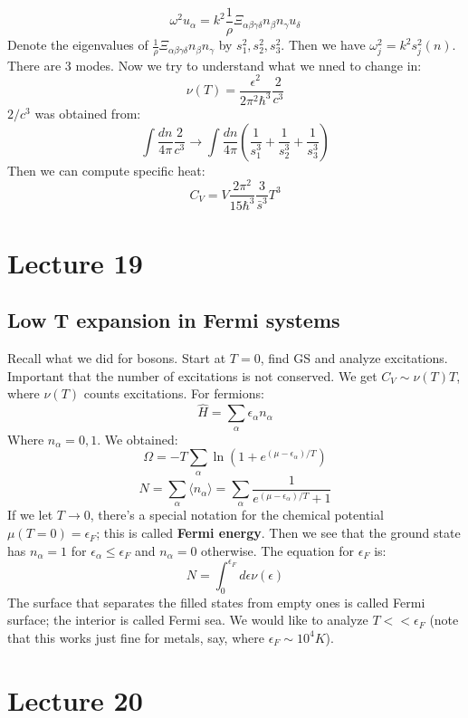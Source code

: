 \documentclass[12 pt]{article}
\begin{document}
\[            \omega^2 u_{\alpha} = k^2 \frac{1}{\rho} \Xi_{\alpha \beta \gamma \delta} n_{\beta} n_{\gamma} u_{\delta}      \]
Denote the eigenvalues of $\frac{1}{\rho} \Xi_{\alpha \beta \gamma \delta} n_{\beta} n_{\gamma}$ by $s_1^2, s_2^2, s_3^2$. Then we have $\omega_j^2 = k^2 s_j^2(n)$. There are 3 modes. Now we try to understand what we nned to change in:
\[       \nu(T) = \frac{\epsilon^2}{2\pi^2\hbar^3} \frac{2}{c^3}     \]
$2/c^3$ was obtained from:
\[       \int \frac{d n}{4\pi}  \frac{2}{c^3} \to  \int \frac{d n}{4\pi} \left( \frac{1}{s_1^3} + \frac{1}{s_2^3} + \frac{1}{s_3^3}  \right)   \]
Then we can compute specific heat:
\[        C_V = V \frac{2\pi^2}{15 \hbar^3} \frac{3}{\bar s^3} T^3       \]


\section*{Lecture 19}
\subsection*{Low T expansion in Fermi systems}
Recall what we did for bosons. Start at $T=0$, find GS and analyze excitations. Important that the number of excitations is not conserved. We get $C_V \sim \nu(T) T$, where $\nu(T)$ counts excitations. For fermions:
\[       \hat H = \sum_{\alpha} \epsilon_{\alpha} n_{\alpha}    \]
Where $n_{\alpha} = 0,1$. We obtained:
\[      \Omega = - T \sum_{\alpha} \ln(1 + e^{(\mu - \epsilon_{\alpha})/T} )    \]
\[         N = \sum_{\alpha} \langle n_{\alpha} \rangle = \sum_{\alpha} \frac{1}{e^{(\mu - \epsilon_{\alpha})/T}+1}    \]
If we let $T\to 0$, there's a special notation for the chemical potential $\mu(T=0) = \epsilon_F$; this is called \textbf{Fermi energy}. Then we see that the ground state has $n_{\alpha} = 1$ for $\epsilon_{\alpha} \leq \epsilon_F$ and $n_{\alpha} = 0$ otherwise. The equation for $\epsilon_F$ is:
\[      N = \int_0^{\epsilon_F} d\epsilon \nu(\epsilon)    \]
The surface that separates the filled states from empty ones is called Fermi surface; the interior is called Fermi sea. We would like to analyze $T<<\epsilon_F$ (note that this works just fine for metals, say, where $\epsilon_F \sim 10^4 K$).




\section*{Lecture 20}
\end{document}
